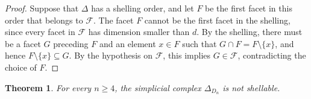 \documentclass[11pt]{amsart}
\def\cF{\mathcal{F}}
\theoremstyle{plain}
\numberwithin{lemma}{\DefaultNumberTheoremWithin}
\newtheorem{theorem}{Theorem}
\numberwithin{theorem}{\DefaultNumberTheoremWithin}
\numberwithin{corollary}{\DefaultNumberTheoremWithin}
\numberwithin{proposition}{\DefaultNumberTheoremWithin}
\numberwithin{conjecture}{\DefaultNumberTheoremWithin}
\theoremstyle{definition}
\numberwithin{definition}{\DefaultNumberTheoremWithin}
\numberwithin{question}{\DefaultNumberTheoremWithin}
\numberwithin{problem}{\DefaultNumberTheoremWithin}
\theoremstyle{remark}
\numberwithin{remark}{\DefaultNumberTheoremWithin}
\numberwithin{example}{\DefaultNumberTheoremWithin}
\numberwithin{claim}{\DefaultNumberTheoremWithin}
\begin{document}
\begin{proof}
Suppose that $\Delta$ has a shelling order, and let $F$ be the
first facet in this order that belongs to $\cF$. The facet $F$ cannot be the first facet in the shelling, since
every facet in $\cF$ has dimension smaller than $d$.
By the shelling, there must be a facet $G$ preceding $F$ and an element
$x\in F$ such that
$
G\cap F=F\setminus\{x\}
$, and hence $F \setminus \{x\} \subseteq G$.
By the hypothesis on $\cF$, this implies 
$G\in\cF$, contradicting the choice of $F$.
\end{proof}

\begin{theorem}\label{thm:Dn-nonshellable}
For every $n\geq4$, the simplicial complex
$\Delta_{D_n}$ is not shellable.
\end{theorem}
\end{document}
